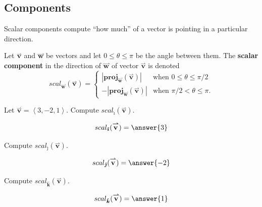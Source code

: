 \documentclass{ximera}
\begin{document}
\subsection{Components}
Scalar components compute ``how much'' of a vector is pointing in a
particular direction.
\begin{definition}
  Let $\overset{\boldsymbol{\rightharpoonup}}{\mathbf{v}}$ and $\overset{\boldsymbol{\rightharpoonup}}{\mathbf{w}}$ be vectors and let $0\le\theta\le\pi$ be
  the angle between them.  The \textbf{scalar component}
  in the direction of $\overset{\boldsymbol{\rightharpoonup}}{\mathbf{w}}$ of vector $\overset{\boldsymbol{\rightharpoonup}}{\mathbf{v}}$ is denoted
  \[
  scal_{\overset{\boldsymbol{\rightharpoonup}}{\mathbf{w}}}(\overset{\boldsymbol{\rightharpoonup}}{\mathbf{v}})=
  \begin{cases}
    |\mathbf{proj}_{\overset{\boldsymbol{\rightharpoonup}}{\mathbf{w}}}(\overset{\boldsymbol{\rightharpoonup}}{\mathbf{v}})| &\text{when $0\le\theta\le \pi/2$}\\
    -|\mathbf{proj}_{\overset{\boldsymbol{\rightharpoonup}}{\mathbf{w}}}(\overset{\boldsymbol{\rightharpoonup}}{\mathbf{v}})| &\text{when $\pi/2<\theta\le \pi$.}
  \end{cases}
  \]
\end{definition}



\begin{question}
  Let $\overset{\boldsymbol{\rightharpoonup}}{\mathbf{v}} = \left< 3,-2,1 \right>$. Compute $scal_{\boldsymbol{\hat{\imath}}}(\overset{\boldsymbol{\rightharpoonup}}{\mathbf{v}})$.
  \begin{prompt}
    \[
    scal_{\boldsymbol{\hat{\imath}}}(\overset{\boldsymbol{\rightharpoonup}}{\mathbf{v}}) = \answer{3}
    \]
  \end{prompt}
  \begin{question}
    Compute $scal_{\boldsymbol{\hat{\jmath}}}(\overset{\boldsymbol{\rightharpoonup}}{\mathbf{v}})$.
    \begin{prompt}
      \[
      scal_{\boldsymbol{\hat{\jmath}}}(\overset{\boldsymbol{\rightharpoonup}}{\mathbf{v}}) = \answer{-2}
      \]
    \end{prompt}
    \begin{question}
      Compute $scal_{\boldsymbol{\hat{k}}}(\overset{\boldsymbol{\rightharpoonup}}{\mathbf{v}})$.
      \begin{prompt}
        \[
        scal_{\boldsymbol{\hat{k}}}(\overset{\boldsymbol{\rightharpoonup}}{\mathbf{v}}) = \answer{1}
        \]
      \end{prompt}
    \end{question}
  \end{question}
\end{question}
\end{document}
